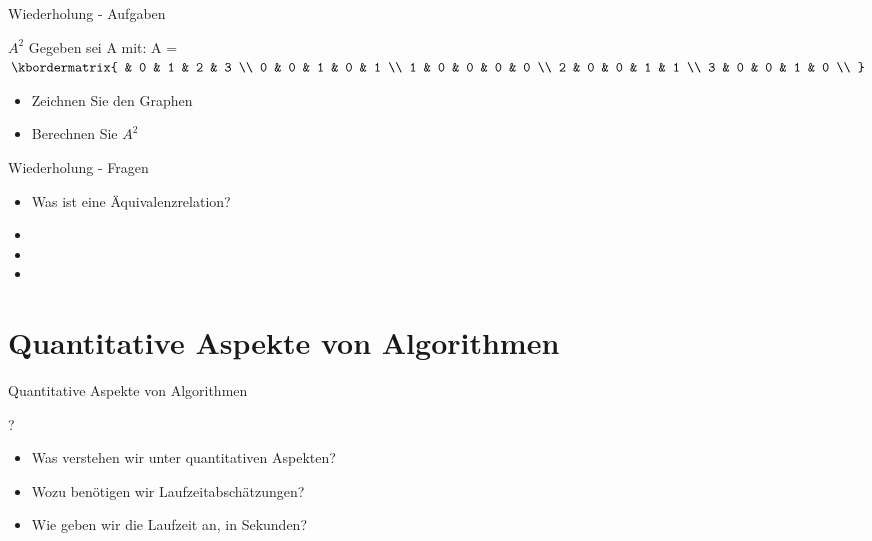 	\begin{frame} {Wiederholung - Aufgaben}
		\begin{block}{$A^2$}
			Gegeben sei A mit:
			A = $\kbordermatrix{
          		  & 0 & 1 & 2 & 3 \\
        		0 & 0 & 1 & 0 & 1 \\
        		1 & 0 & 0 & 0 & 0 \\
        		2 & 0 & 0 & 1 & 1 \\
        		3 & 0 & 0 & 1 & 0 \\
      			}$\\
      			
      		\begin{itemize}
      			\item Zeichnen Sie den Graphen
      			\pause
      			\item Berechnen Sie $A^2$
			\end{itemize}      						 
		\end{block}
	\end{frame}
	
	
	\begin{frame} {Wiederholung - Fragen}
		\begin{itemize}
			\item Was ist eine Äquivalenzrelation?
			
			\item {}
			
			\item {}
			
			\item {}
		\end{itemize}
	\end{frame}
	
	
	
	\section{Quantitative Aspekte von Algorithmen}
	\begin{frame}{Quantitative Aspekte von Algorithmen}
		\begin{block}{?}
			
			\begin{itemize}
				\item Was verstehen wir unter quantitativen Aspekten?
				\pause
				\item Wozu benötigen wir Laufzeitabschätzungen?
				\pause
				\item Wie geben wir die Laufzeit an, in Sekunden?
			\end{itemize}						
		\end{block}
	\end{frame}		
	
